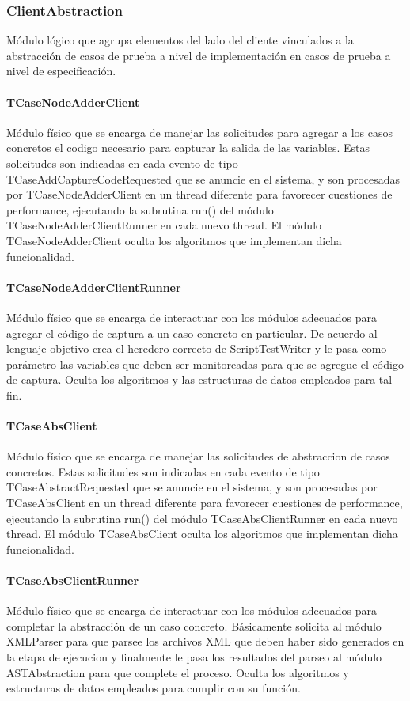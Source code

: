 \documentclass[a4paper,10pt]{report}
\begin{document}
			\subsubsection{ClientAbstraction}
			Módulo lógico que agrupa elementos del lado del cliente vinculados a la abstracción de casos de prueba a nivel de implementación en casos de prueba a nivel de especificación.
				\paragraph{TCaseNodeAdderClient}
				Módulo físico que se encarga de manejar las solicitudes para agregar a los casos concretos el codigo necesario para capturar la salida de las variables. Estas solicitudes son indicadas en cada evento de tipo TCaseAddCaptureCodeRequested que se anuncie en el sistema, y son procesadas por TCaseNodeAdderClient en un thread diferente para favorecer cuestiones de performance, ejecutando la subrutina run() del módulo TCaseNodeAdderClientRunner en cada nuevo thread. El módulo TCaseNodeAdderClient oculta los algoritmos que implementan dicha funcionalidad.
				\paragraph{TCaseNodeAdderClientRunner}
				Módulo físico que se encarga de interactuar con los módulos adecuados para agregar el código de captura a un caso concreto en particular. De acuerdo al lenguaje objetivo crea el heredero correcto de ScriptTestWriter y le pasa como parámetro las variables que deben ser monitoreadas para que se agregue el código de captura. Oculta los algoritmos y las estructuras de datos empleados para tal fin.
				\paragraph{TCaseAbsClient}
				Módulo físico que se encarga de manejar las solicitudes de abstraccion de casos concretos. Estas solicitudes son indicadas en cada evento de tipo TCaseAbstractRequested que se anuncie en el sistema, y son procesadas por TCaseAbsClient en un thread diferente para favorecer cuestiones de performance, ejecutando la subrutina run() del módulo TCaseAbsClientRunner en cada nuevo thread. El módulo TCaseAbsClient oculta los algoritmos que implementan dicha funcionalidad.
				\paragraph{TCaseAbsClientRunner}
				Módulo físico que se encarga de interactuar con los módulos adecuados para completar la abstracción de un caso concreto. Básicamente solicita al módulo XMLParser para que parsee los archivos XML que deben haber sido generados en la etapa de ejecucion y finalmente le pasa los resultados del parseo al módulo ASTAbstraction para que complete el proceso.
				Oculta los algoritmos y estructuras de datos empleados para cumplir con su función.
\end{document}
